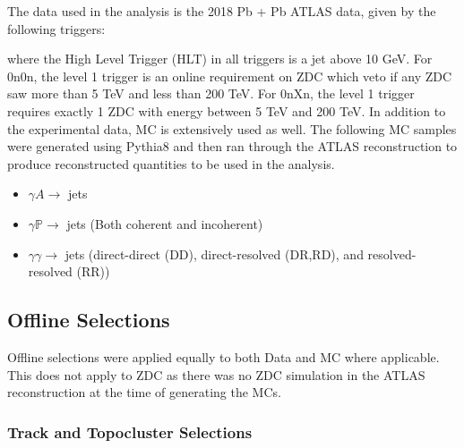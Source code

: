 
The data used in the analysis is the 2018 Pb + Pb ATLAS data, given by the following triggers:



where  the High Level Trigger (HLT) in all triggers is a jet above 10 GeV. For 0n0n, the level 1 trigger is an online requirement on ZDC which veto if any ZDC saw more than 5 TeV and less than 200 TeV. For 0nXn, the level 1 trigger requires exactly 1 ZDC with energy between  5  TeV and  200 TeV. In addition to the experimental data, MC is extensively used as well. The following MC samples were generated using Pythia8 \cite{bierlich_comprehensive_2022} and then ran through the ATLAS reconstruction to produce reconstructed quantities to be used in the analysis.

\begin{itemize}
	\item $\gamma A \rightarrow$ jets
	\item $\gamma \mathbb{P} \rightarrow$ jets (Both coherent and incoherent) 
	\item $\gamma \gamma \rightarrow$ jets (direct-direct (DD), direct-resolved (DR,RD), and resolved-resolved (RR))
\end{itemize}

\subsection{Offline Selections}

Offline selections were applied equally to both Data and MC where applicable. This does not apply to ZDC as there was no ZDC simulation in the ATLAS reconstruction at the time of generating the MCs.

\subsubsection{Track and Topocluster Selections}

